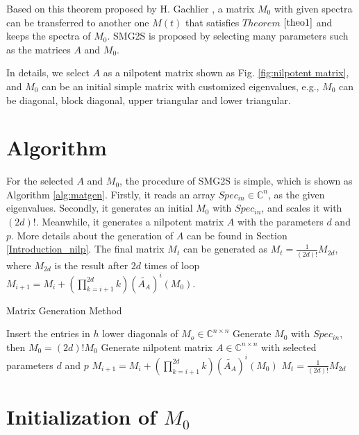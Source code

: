 \documentclass[a4paper, 10 pt]{report}
\begin{document}
	Based on this theorem proposed by H. Gachlier \cite{galichergenerate}, a matrix $M_0$ with given spectra can be transferred to another one $M(t)$ that satisfies $Theorem$ $\ref{theo1}$ and keeps the spectra of $M_0$. SMG2S is proposed by selecting many parameters such as the matrices $A$ and $M_0$. 
	
	In details, we select $A$ as a nilpotent matrix shown as Fig. \ref{fig:nilpotent matrix}, and $M_0$ can be an initial simple matrix with customized eigenvalues, e.g., $M_0$ can be diagonal, block diagonal, upper triangular and lower triangular.
	
	\section{Algorithm}
	
	For the selected $A$ and $M_0$, the procedure of SMG2S is simple, which is shown as Algorithm \ref{alg:matgen}. Firstly, it reads an array $Spec_{in} \in \mathbb{C}^{n}$, as the given eigenvalues.  Secondly, it generates an initial $M_0$ with $Spec_{in}$, and scales it with $(2d)!$. Meanwhile, it generates a nilpotent matrix $A$ with the parameters $d$ and $p$. More details about the generation of $A$ can be found in Section \ref{Introduction_nilp}. The final matrix $M_t$ can be generated as $M_t=\frac{1}{(2d)!}M_{2d}$, where $M_{2d}$ is the result after $2d$ times of loop $M_{i+1}=M_i+(\prod_{k=i+1}^{2d}k)(\widetilde{A_A})^i(M_0)$. 
	
	\begin{algorithm*}[htbp]{}
		\caption{Matrix Generation Method}   
		\label{alg:matgen}   
		\begin{algorithmic}[1]
			\State Insert the entries in $h$ lower diagonals of $M_o \in \mathbb{C}^{n \times n}$
			\State Generate $M_0$ with $Spec_{in}$, then $M_0=(2d)!M_0$ \label{alg:generate}
			\State Generate nilpotent matrix $A \in \mathbb{C}^{n\times n}$ with selected parameters $d$ and $p$
			\State $M_{i+1}=M_i+(\prod_{k=i+1}^{2d}k)(\widetilde{A_A})^i(M_0)$
			\EndFor 
			\State $M_t = \frac{1}{(2d)!}M_{2d}$
			\EndFunction
		\end{algorithmic}
	\end{algorithm*}
	
	\section{Initialization of $M_0$}
	
\end{document}
